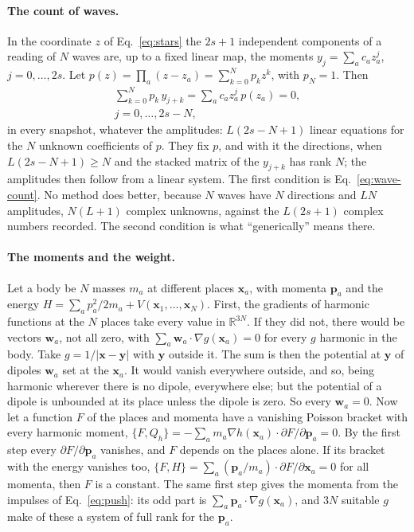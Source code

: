 \paragraph{The count of waves.} In the coordinate $z$ of Eq.~\eqref{eq:stars}
the $2s + 1$ independent components of a reading of $N$ waves are, up to a fixed
linear map, the moments $y_j = \sum_a c_a z_a^j$, $j = 0, \dots, 2s$. Let
$p(z) = \prod_a (z - z_a) = \sum_{k=0}^{N} p_k z^k$, with $p_N = 1$. Then
\begin{equation}\label{eq:proof-prony}
\begin{gathered}
\sum_{k=0}^{N} p_k\,y_{j+k} = \sum_a c_a z_a^j\,p(z_a) = 0,\\
j = 0, \dots, 2s - N,
\end{gathered}
\end{equation}
in every snapshot, whatever the amplitudes: $L(2s - N + 1)$ linear equations for
the $N$ unknown coefficients of $p$. They fix $p$, and with it the directions,
when $L(2s - N + 1) \ge N$ and the stacked matrix of the $y_{j+k}$ has rank $N$;
the amplitudes then follow from a linear system. The first condition is
Eq.~\eqref{eq:wave-count}. No method does better, because $N$ waves have $N$
directions and $LN$ amplitudes, $N(L + 1)$ complex unknowns, against the
$L(2s + 1)$ complex numbers recorded. The second condition is what
``generically'' means there.

\paragraph{The moments and the weight.} Let a body be $N$ masses $m_a$ at
different places $\mathbf x_a$, with momenta $\mathbf p_a$ and the energy
$H = \sum_a p_a^2/2m_a + V(\mathbf x_1, \dots, \mathbf x_N)$. First, the
gradients of harmonic functions at the $N$ places take every value in
$\mathbb R^{3N}$. If they did not, there would be vectors $\mathbf w_a$, not
all zero, with $\sum_a\mathbf w_a\cdot\nabla g(\mathbf x_a) = 0$ for every $g$
harmonic in the body. Take $g = 1/|\mathbf x - \mathbf y|$ with $\mathbf y$
outside it. The sum is then the potential at $\mathbf y$ of dipoles
$\mathbf w_a$ set at the $\mathbf x_a$. It would vanish everywhere outside,
and so, being harmonic wherever there is no dipole, everywhere else; but the
potential of a dipole is unbounded at its place unless the dipole is zero. So
every $\mathbf w_a = 0$. Now let a function $F$ of the places and momenta have
a vanishing Poisson bracket with every harmonic moment,
$\{F, Q_h\} = -\sum_a m_a\nabla h(\mathbf x_a)\cdot\partial F/\partial\mathbf p_a = 0$.
By the first step every $\partial F/\partial\mathbf p_a$ vanishes, and $F$
depends on the places alone. If its bracket with the energy vanishes too,
$\{F, H\} = \sum_a(\mathbf p_a/m_a)\cdot\partial F/\partial\mathbf x_a = 0$
for all momenta, then $F$ is a constant. The same first step gives the momenta
from the impulses of Eq.~\eqref{eq:push}: its odd part is
$\sum_a\mathbf p_a\cdot\nabla g(\mathbf x_a)$, and $3N$ suitable $g$ make of
these a system of full rank for the $\mathbf p_a$.

